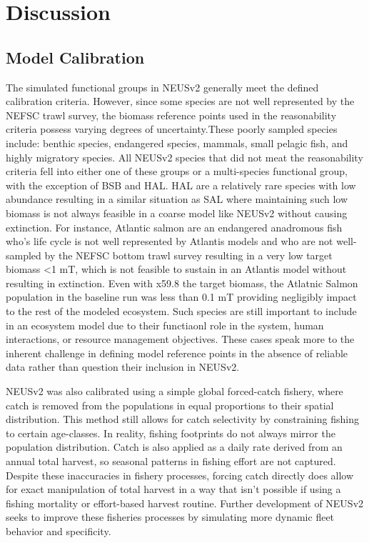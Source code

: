\documentclass[
]{article}
\begin{document}
\section{Discussion}\label{discussion}

\subsection{Model Calibration}\label{model-calibration}

The simulated functional groups in NEUSv2 generally meet the defined calibration criteria. However, since some species are not well represented by the NEFSC trawl survey, the biomass reference points used in the reasonability criteria possess varying degrees of uncertainty.These poorly sampled species include: benthic species, endangered species, mammals, small pelagic fish, and highly migratory species. All NEUSv2 species that did not meat the reasonability criteria fell into either one of these groups or a multi-species functional group, with the exception of BSB and HAL. HAL are a relatively rare species with low abundance resulting in a similar situation as SAL where maintaining such low biomass is not always feasible in a coarse model like NEUSv2 without causing extinction. For instance, Atlantic salmon are an endangered anadromous fish who's life cycle is not well represented by Atlantis models and who are not well-sampled by the NEFSC bottom trawl survey resulting in a very low target biomass \textless1 mT, which is not feasible to sustain in an Atlantis model without resulting in extinction. Even with x59.8 the target biomass, the Atlatnic Salmon population in the baseline run was less than 0.1 mT providing negligibly impact to the rest of the modeled ecosystem. Such species are still important to include in an ecosystem model due to their functiaonl role in the system, human interactions, or resource management objectives. These cases speak more to the inherent challenge in defining model reference points in the absence of reliable data rather than question their inclusion in NEUSv2.

NEUSv2 was also calibrated using a simple global forced-catch fishery, where catch is removed from the populations in equal proportions to their spatial distribution. This method still allows for catch selectivity by constraining fishing to certain age-classes. In reality, fishing footprints do not always mirror the population distribution. Catch is also applied as a daily rate derived from an annual total harvest, so seasonal patterns in fishing effort are not captured. Despite these inaccuracies in fishery processes, forcing catch directly does allow for exact manipulation of total harvest in a way that isn't possible if using a fishing mortality or effort-based harvest routine. Further development of NEUSv2 seeks to improve these fisheries processes by simulating more dynamic fleet behavior and specificity.
\end{document}
